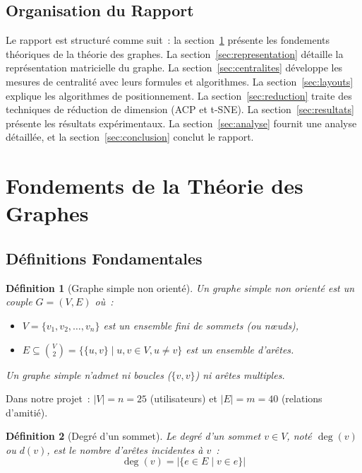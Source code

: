 \documentclass[12pt,a4paper]{article}
\newtheorem{definition}{Définition}[section]
\begin{document}
\subsection{Organisation du Rapport}

Le rapport est structuré comme suit~: la section~\ref{sec:theorie} présente les fondements théoriques de la théorie des graphes. La section~\ref{sec:representation} détaille la représentation matricielle du graphe. La section~\ref{sec:centralites} développe les mesures de centralité avec leurs formules et algorithmes. La section~\ref{sec:layouts} explique les algorithmes de positionnement. La section~\ref{sec:reduction} traite des techniques de réduction de dimension (ACP et t-SNE). La section~\ref{sec:resultats} présente les résultats expérimentaux. La section~\ref{sec:analyse} fournit une analyse détaillée, et la section~\ref{sec:conclusion} conclut le rapport.

\section{Fondements de la Théorie des Graphes}
\label{sec:theorie}

\subsection{Définitions Fondamentales}

\begin{definition}[Graphe simple non orienté]
Un \emph{graphe simple non orienté} est un couple $G = (V, E)$ où~:
\begin{itemize}
    \item $V = \{v_1, v_2, \ldots, v_n\}$ est un ensemble fini de \emph{sommets} (ou n\oe{}uds),
    \item $E \subseteq \binom{V}{2} = \{\{u, v\} \mid u, v \in V, u \neq v\}$ est un ensemble d'\emph{arêtes}.
\end{itemize}
Un graphe simple n'admet ni boucles ($\{v, v\}$) ni arêtes multiples.
\end{definition}

Dans notre projet~: $|V| = n = 25$ (utilisateurs) et $|E| = m = 40$ (relations d'amitié).

\begin{definition}[Degré d'un sommet]
Le \emph{degré} d'un sommet $v \in V$, noté $\deg(v)$ ou $d(v)$, est le nombre d'arêtes incidentes à $v$~:
\[
    \deg(v) = |\{e \in E \mid v \in e\}|
\]
\end{definition}
\end{document}
